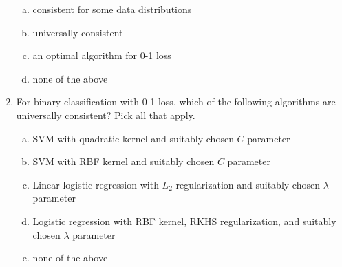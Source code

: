 \begin{enumerate}[1.]
\begin{enumerate}[(a)]
\item consistent for some data distributions
\item universally consistent
\item an optimal algorithm for 0-1 loss
\item none of the above
\end{enumerate}
%
\vspace{4pt}
%
\item
For binary classification with 0-1 loss, which of the following algorithms are universally consistent? Pick all that apply.
\begin{enumerate}[(a)]
\item SVM with quadratic kernel and suitably chosen $C$ parameter
\item SVM with RBF kernel and suitably chosen $C$ parameter
\item Linear logistic regression with $L_2$ regularization and suitably chosen $\lambda$ parameter 
\item Logistic regression with RBF kernel, RKHS regularization, and suitably chosen $\lambda$ parameter 
\item none of the above
\end{enumerate}
\end{enumerate}
